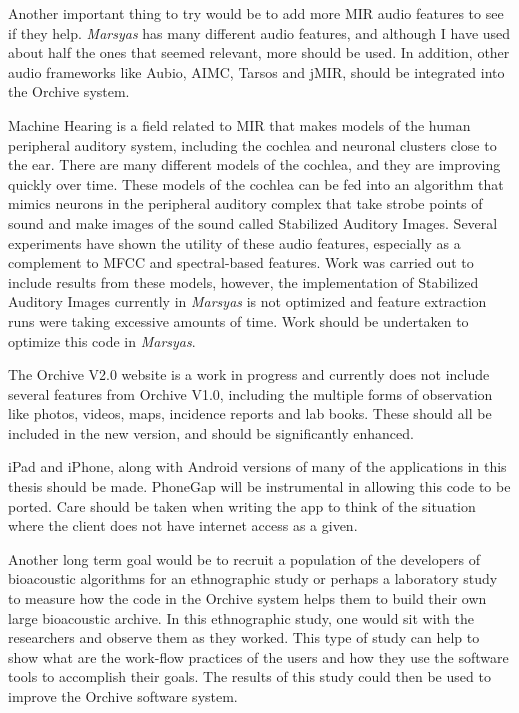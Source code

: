 \documentclass[12pt,oneside]{book}
\begin{document}
Another important thing to try would be to add more MIR audio features
to see if they help.  \textit{Marsyas} has many different audio features, and
although I have used about half the ones that seemed relevant, more
should be used.  In addition, other audio frameworks like Aubio, AIMC,
Tarsos and jMIR, should be integrated into the Orchive system.

Machine Hearing is a field related to MIR that makes models of the
human peripheral auditory system, including the cochlea and neuronal
clusters close to the ear.  There are many different models of the
cochlea, and they are improving quickly over time.  These models of
the cochlea can be fed into an algorithm that mimics neurons in the
peripheral auditory complex that take strobe points of sound and make
images of the sound called Stabilized Auditory Images.  Several
experiments have shown the utility of these audio features, especially
as a complement to MFCC and spectral-based features.  Work was carried
out to include results from these models, however, the implementation
of Stabilized Auditory Images currently in \textit{Marsyas} is not optimized
and feature extraction runs were taking excessive amounts of time.
Work should be undertaken to optimize this code in \textit{Marsyas}.

The Orchive V2.0 website is a work in progress and currently does not
include several features from Orchive V1.0, including the multiple
forms of observation like photos, videos, maps, incidence reports and
lab books.  These should all be included in the new version, and
should be significantly enhanced.

iPad and iPhone, along with Android versions of many of the
applications in this thesis should be made.  PhoneGap will be
instrumental in allowing this code to be ported.  Care should be taken
when writing the app to think of the situation where the client does
not have internet access as a given.

Another long term goal would be to recruit a population of the
developers of bioacoustic algorithms for an ethnographic study or
perhaps a laboratory study to measure how the code in the Orchive
system helps them to build their own large bioacoustic archive.  In
this ethnographic study, one would sit with the researchers and
observe them as they worked.  This type of study can help to show what
are the work-flow practices of the users and how they use the software
tools to accomplish their goals.  The results of this study could then
be used to improve the Orchive software system.
\end{document}
